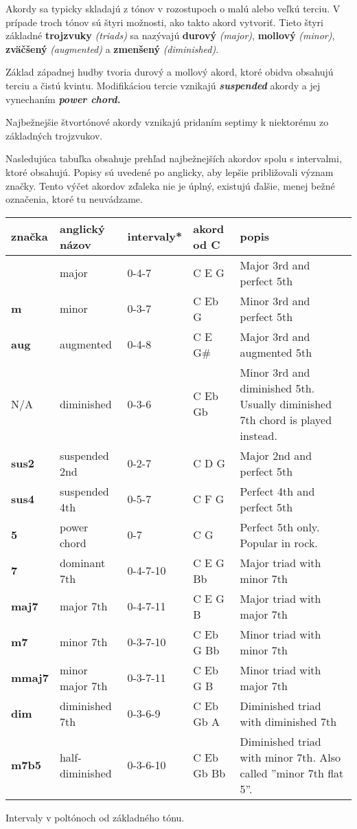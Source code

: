 Akordy sa typicky skladajú z tónov v rozostupoch o malú alebo veľkú terciu. V prípade troch tónov sú štyri možnosti,
ako takto akord vytvoriť. Tieto štyri základné \textbf{trojzvuky} \textit{(triads)} sa nazývajú
\textbf{durový} \textit{(major)}, \textbf{mollový} \textit{(minor)}, \textbf{zväčšený} \textit{(augmented)}
a \textbf{zmenšený} \textit{(diminished)}.

Základ západnej hudby tvoria durový a mollový akord, ktoré obidva obsahujú terciu a čistú kvintu. Modifikáciou
tercie vznikajú \textbf{\textit{suspended}} akordy a jej vynechaním \textbf{\textit{power chord.}}

Najbežnejšie štvortónové akordy vznikajú pridaním septimy k niektorému zo základných trojzvukov.

Nasledujúca tabuľka obsahuje prehľad najbežnejších akordov spolu s intervalmi, ktoré obsahujú.
Popisy sú uvedené po anglicky, aby lepšie približovali význam značky. Tento výčet akordov zďaleka
nie je úplný, existujú ďalšie, menej bežné označenia, ktoré tu neuvádzame.

{\smaller
\begin{tabularx}{\linewidth}{ l l l l X }
    značka & anglický názov & intervaly* & akord od C & popis \\
    \hline
      & major & 0-4-7 & C E G & Major 3rd and perfect 5th \\
    \textbf{m} & minor & 0-3-7 & C Eb G & Minor 3rd and perfect 5th \\
    \textbf{aug} & augmented & 0-4-8 & C E G\# & Major 3rd and augmented 5th \\
    N/A & diminished & 0-3-6 & C Eb Gb & Minor 3rd and diminished 5th. Usually diminished 7th chord is played instead. \\
    \hline
    \textbf{sus2} & suspended 2nd & 0-2-7 & C D G & Major 2nd and perfect 5th  \\
    \textbf{sus4} & suspended 4th & 0-5-7 & C F G & Perfect 4th and perfect 5th \\
    \textbf{5} & power chord & 0-7 & C G & Perfect 5th only. Popular in rock. \\
    \hline
    \textbf{7} & dominant 7th &  0-4-7-10 & C E G Bb & Major triad with minor 7th  \\
    \textbf{maj7} & major 7th &  0-4-7-11 & C E G B & Major triad with major 7th \\
    \textbf{m7} & minor 7th &  0-3-7-10 & C Eb G Bb & Minor triad with minor 7th \\
    \textbf{mmaj7} & minor major 7th &  0-3-7-11 & C Eb G B & Minor triad with major 7th \\
    \textbf{dim} & diminished 7th &  0-3-6-9 & C Eb Gb A & Diminished triad with diminished 7th \\
    \textbf{m7b5} & half-diminished &  0-3-6-10 & C Eb Gb Bb & Diminished triad with minor 7th. Also called ''minor 7th flat 5''. \\
\end{tabularx}
}
{\smaller *Intervaly v poltónoch od základného tónu.}


